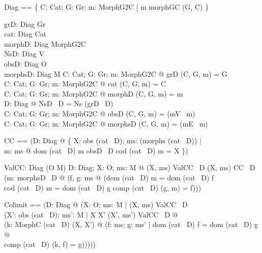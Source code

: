 \begin{zed}
Diag == \{  C: Cat; G: Gr; m: MorphG2C | m \in  morphGC (G, C) \}
\end{zed}

\begin{axdef}
  grD: Diag \fun  Gr\\
  cat: Diag \fun  Cat\\
  morphD: Diag \fun  MorphG2C\\
  NsD: Diag \fun  \power  V\\
  obsD: Diag \fun  \power  O\\
  morphsD: Diag \fun  \power  M
\where
  \forall  C: Cat; G: Gr; m: MorphG2C @ grD (C, G, m) = G\\
  \forall  C: Cat; G: Gr; m: MorphG2C @ cat (C, G, m) = C\\
  \forall  C: Cat; G: Gr; m: MorphG2C @ morphD (C, G, m) = m\\
  \forall  D: Diag @  NsD~ D = Ns (grD~ D)\\
  \forall  C: Cat; G: Gr; m: MorphG2C @ obsD (C, G, m) = \ran  (mV~ m)\\
  \forall  C: Cat; G: Gr; m: MorphG2C @ morphsD (C, G, m) = \ran  (mE~ m)
\end{axdef}

\begin{zed}
CC == (\lambda  D: Diag @ \{  X: obs (cat~ D); ms: \power  (morphs (cat~ D)) | \\ \quad 
\forall  m: ms @ dom (cat~ D) m \in  obsD~ D \land  cod (cat~ D) m = X \})
\end{zed}

\begin{axdef}
  ValCC: Diag \fun  \power  (O \cross  \power  M)
\where
  \forall  D: Diag; X: O; ms: \power  M @ (X, ms) \in  ValCC~ D \iff  (X, ms) \in  CC~ D \\ \quad 
\land  (\forall  m: morphsD~ D @ (\exists  f, g: ms @ (dom (cat~ D) m = dom (cat~ D) f \\ \qquad 
\land  cod (cat~ D) m = dom (cat~ D) g \land  comp (cat~ D) (g, m) = f)))
\end{axdef}

\begin{zed}
Colimit == (\lambda  D: Diag @ 
(\mu  X: O; ms: \power  M | (X, ms) \in  ValCC~ D  \\ \quad 
\land  (\forall  X': obs (cat~ D); ms': \power  M | X \neq  X' \land  (X', ms') \in  ValCC~ D 
@  \\ \qquad 
(\exists  k: MorphC (cat~ D) (X, X') @ (\forall  f: ms; g: ms' | dom (cat~ D) f = dom (cat~ D) g @ \\ \qquad  \quad 
comp (cat~ D) (k, f) = g)))))
\end{zed}

